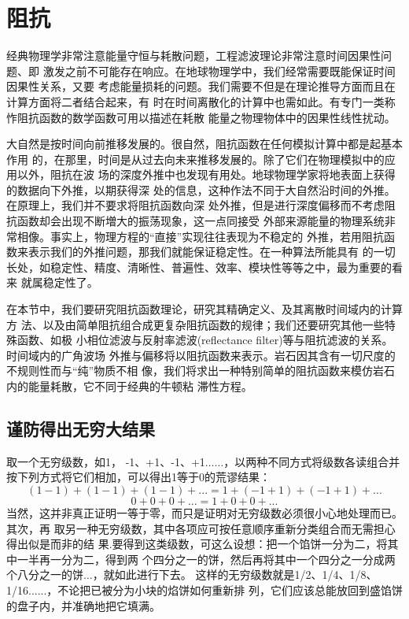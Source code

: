\section{阻抗}
\label{sec:4.6}

经典物理学非常注意能量守恒与耗散问题，工程滤波理论非常注意时间因果性问题、即
激发之前不可能存在响应。在地球物理学中，我们经常需要既能保证时间因果性关系，又要
考虑能量损耗的问题。我们需要不但是在理论推导方面而且在计算方面将二者结合起来，有
时在时间离散化的计算中也需如此。有专门一类称怍阻抗函数的数学函数可用以描述在耗散
能量之物理物体中的因果性线性扰动。

大自然是按时间向前推移发展的。很自然，阻抗函数在任何模拟计算中都是起基本作用
的，在那里，时间是从过去向未来推移发展的。除了它们在物理模拟中的应用以外，阻抗在波
场的深度外推中也发现有用处。地球物理学家将地表面上获得的数据向下外推，以期获得深
处的信息，这种作法不同于大自然沿时间的外推。在原理上，我们并不要求将阻抗函数向深
处外推，但是进行深度偏移而不考虑阻抗函数却会出现不断増大的振荡现象，这一点同接受
外部来源能量的物理系统非常相像。事实上，物理方程的“直接”实现往往表现为不稳定的
外推，若用阻抗函数来表示我们的外推问题，那我们就能保证稳定性。在一种算法所能具有
的一切长处，如稳定性、精度、清晰性、普遍性、效率、模块性等等之中，最为重要的看来
就属稳定性了。

在本节中，我们要研究阻抗函数理论，研究其精确定义、及其离散时间域内的计算方
法、以及由简单阻抗组合成更复杂阻抗函数的规律；我们还要研究其他一些特殊函数、如极
小相位滤波与反射率滤波(reflectance filter)等与阻抗滤波的关系。时间域内的广角波场
外推与偏移将以阻抗函数来表示。岩石因其含有一切尺度的不规则性而与“纯”物质不相
像，我们将求出一种特别简单的阻抗函数来模仿岩石内的能量耗散，它不同于经典的牛顿粘
滞性方程。

\subsection{谨防得出无穷大结果}
\label{sec:4.6.1}

取一个无穷级数，如1，
-1、+1、-1、+1$\ldots\ldots$，以两种不同方式将级数各读组合并
按下列方式将它们相加，可以得出1等于0的荒谬结果：
\begin{equation*}
(1-1)+(1-1)+(1-1)+...=1+(-1+1)+(-1+1)+...
\end{equation*}
\begin{equation*}
0+0+0+...=1+0+0+...
\end{equation*}
当然，这并非真正证明一等于零，而只是证明对无穷级数必须很小心地处理而已。其次，再
取另一种无穷级数，其中各项应可按任意顺序重新分类组合而无需担心得出似是而非的结
果.要得到这类级数，可这么设想：把一个馅饼一分为二，将其中一半再一分为二，得到两
个四分之一的饼，然后再将其中一个四分之一分成两个八分之一的饼$\ldots$，就如此进行下去。
这样的无穷级数就是1/2、1/4、1/8、1/16......，不论把已被分为小块的焰饼如何重新排
列，它们应该总能放回到盛馅饼的盘子内，并准确地把它填满。


